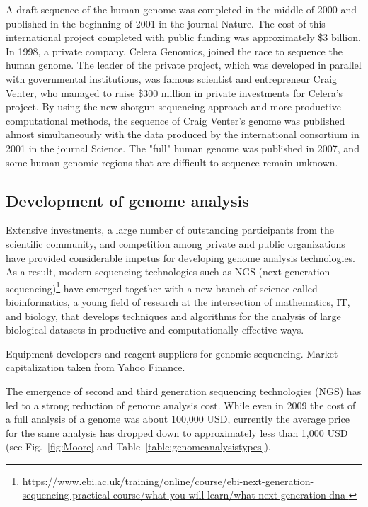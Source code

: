 A draft sequence of the human genome was completed in the middle of 2000 and published in the beginning of 2001 in the journal Nature. The cost of this international project completed with public funding was approximately \$3 billion. In 1998, a private company, Celera Genomics, joined the race to sequence the human genome. The leader of the private project, which was developed in parallel with governmental institutions, was famous scientist and entrepreneur Craig Venter, who managed to raise \$300 million in private investments for Celera’s project. By using the new shotgun sequencing approach and more productive computational methods, the sequence of Craig Venter’s genome was published almost simultaneously with the data produced by the international consortium in 2001\cite{Venter1304} in the journal Science. The "full" human genome was published in 2007, and some human genomic regions that are difficult to sequence remain unknown.

\subsection{Development of genome analysis}
Extensive investments, a large number of outstanding participants from the scientific community, and competition among private and public organizations have provided considerable impetus for developing genome analysis technologies. As a result, modern sequencing technologies such as NGS (next-generation sequencing)\footnote{\url{https://www.ebi.ac.uk/training/online/course/ebi-next-generation-sequencing-practical-course/what-you-will-learn/what-next-generation-dna-}} have emerged together with a new branch of science called bioinformatics, a young field of research at the intersection of mathematics, IT, and biology, that develops techniques and algorithms for the analysis of large biological datasets in productive and computationally effective ways.



\begin{table}[h!]
  \caption{Equipment developers and reagent suppliers for genomic sequencing. Market capitalization taken from \href{https://finance.yahoo.com/}{Yahoo Finance}.}
  \label{table:developers}
  
\end{table}

The emergence of second and third generation sequencing technologies (NGS) has led to a strong reduction of genome analysis cost. While even in 2009 the cost of a full analysis of a genome was about 100,000 USD, currently the average price for the same analysis has dropped down to approximately less than 1,000 USD (see Fig.~\ref{fig:Moore} and Table~\ref{table:genomeanalysistypes}).

